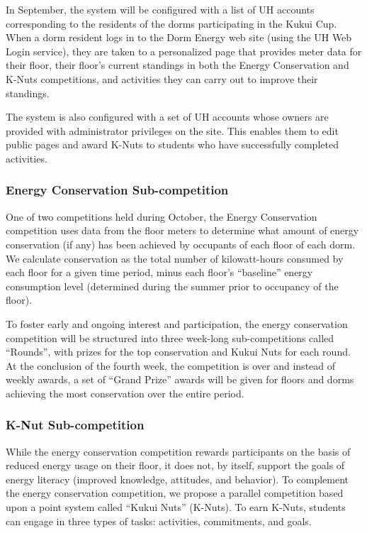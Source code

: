 \documentclass[11pt]{article}
\begin{document}
In September, the system will
be configured with a list of UH accounts corresponding to the residents of
the dorms participating in the Kukui Cup.  When a dorm resident logs in to
the Dorm Energy web site (using the UH Web Login service), they are taken
to a personalized page that provides meter data for their floor, their
floor's current standings in both the Energy Conservation and K-Nuts
competitions, and activities they can carry out to improve their standings.

The system is also configured
with a set of UH accounts whose owners are provided with administrator
privileges on the site.  This enables them to edit public pages and award
K-Nuts to students who have successfully completed activities.

\subsubsection{Energy Conservation Sub-competition}

One of two competitions
held during October, the Energy Conservation competition uses data from the
floor meters to determine what amount of energy conservation (if any) has
been achieved by occupants of each floor of each dorm.  We calculate
conservation as the total number of kilowatt-hours consumed by each floor
for a given time period, minus each floor's ``baseline'' energy consumption
level (determined during the summer prior to occupancy of the floor).

To foster early and ongoing interest and participation, the energy
conservation competition will be structured into three week-long
sub-competitions called ``Rounds'', with prizes for the top conservation and Kukui Nuts
for each round.  At the conclusion of the fourth week, the competition is over and
instead of weekly awards, a set of ``Grand Prize'' awards will be given for
floors and dorms achieving the most conservation over the entire period.

\subsubsection{K-Nut  Sub-competition}

While the energy conservation
competition rewards participants on the basis of reduced energy usage on
their floor, it does not, by itself, support the goals of energy literacy
(improved knowledge, attitudes, and behavior).  To complement the energy
conservation competition, we propose a parallel competition based upon a
point system called ``Kukui Nuts'' (K-Nuts).   To earn K-Nuts, students can 
engage in three types of tasks: activities, commitments, and goals.
\end{document}

